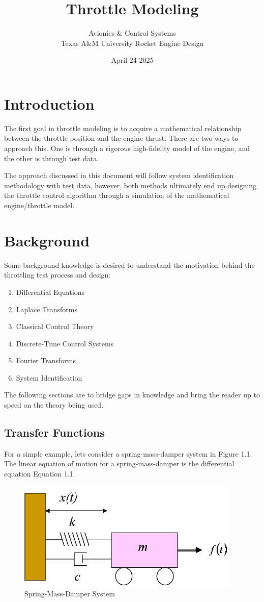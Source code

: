 \documentclass{article}
\title{Throttle Modeling}
\author{Avionics \& Control Systems \\ Texas A\&M University Rocket Engine Design}
\date{April 24 2025}
\begin{document}
\maketitle
\tableofcontents
\newpage
\section{Introduction}

The first goal in throttle modeling is to acquire a mathematical relationship between the throttle position and the engine thrust. There are two ways to approach this. One is through a rigorous high-fidelity model of the engine, and the other is through test data.

The approach discussed in this document will follow system identification methodology with test data, however, both methods ultimately end up designing the throttle control algorithm through a simulation of the mathematical engine/throttle model. 

\section{Background}
Some background knowledge is desired to understand the motivation behind the throttling test process and design:

\begin{enumerate}
    \item Differential Equations
    \item Laplace Transforms
    \item Classical Control Theory
    \item Discrete-Time Control Systems
    \item Fourier Transforms
    \item System Identification
\end{enumerate}

The following sections are to bridge gaps in knowledge and bring the reader up to speed on the theory being used.

\subsection{Transfer Functions}
For a simple example, lets consider a spring-mass-damper system in Figure 1.1. The linear equation of motion for a spring-mass-damper is the differential equation Equation 1.1. 

\begin{figure}[h]
    \centering
    \includegraphics[width=0.5\linewidth]{figures/spring_mass_damper.png}
    \caption{Spring-Mass-Damper System}
    \label{fig:enter-label}
\end{figure}
\end{document}

